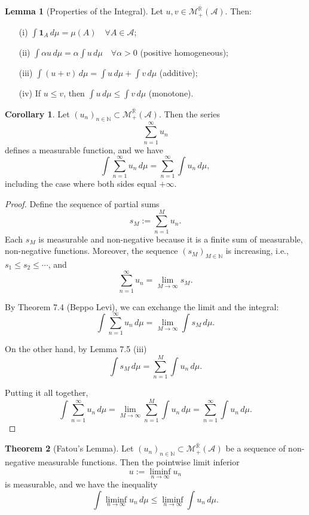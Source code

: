 \documentclass[12pt]{article}
\theoremstyle{definition}
\newtheorem{theorem}{Theorem}[section]
\newtheorem{corollary}{Corollary}[theorem]
\newtheorem{lemma}[theorem]{Lemma}
\begin{document}
\medskip
\begin{lemma}[Properties of the Integral]
Let \( u, v \in \mathcal{M}_+^{\overline{\mathbb{R}}}(\mathcal{A}) \). Then:
\begin{itemize}
    \item[(i)] \( \displaystyle \int \mathbf{1}_A \, d\mu = \mu(A) \quad \forall A \in \mathcal{A} \);
    \item[(ii)] \( \displaystyle \int \alpha u \, d\mu = \alpha \int u \, d\mu \quad \forall \alpha > 0 \) \hfill (positive homogeneous);
    \item[(iii)] \( \displaystyle \int (u + v) \, d\mu = \int u \, d\mu + \int v \, d\mu \) \hfill (additive);
    \item[(iv)] If \( u \leq v \), then \( \displaystyle \int u \, d\mu \leq \int v \, d\mu \) \hfill (monotone).
\end{itemize}
\end{lemma}

\medskip
\begin{corollary}
Let \( (u_n)_{n \in \mathbb{N}} \subset \mathcal{M}_+^{\overline{\mathbb{R}}}(\mathcal{A}) \). Then the series
\[
\sum_{n=1}^{\infty} u_n
\]
defines a measurable function, and we have
\[
\int \sum_{n=1}^{\infty} u_n \, d\mu = \sum_{n=1}^{\infty} \int u_n \, d\mu,
\]
including the case where both sides equal \( +\infty \).
\end{corollary}

\begin{proof}
Define the sequence of partial sums
\[
s_M := \sum_{n=1}^{M} u_n.
\]
Each \( s_M \) is measurable and non-negative because it is a finite sum of measurable, non-negative functions. Moreover, the sequence \( (s_M)_{M \in \mathbb{N}} \) is increasing, i.e., \( s_1 \leq s_2 \leq \cdots \), and
\[
\sum_{n=1}^{\infty} u_n = \lim_{M \to \infty} s_M.
\]

By Theorem 7.4 (Beppo Levi), we can exchange the limit and the integral:
\[
\int \sum_{n=1}^{\infty} u_n \, d\mu = \lim_{M \to \infty} \int s_M \, d\mu.
\]

On the other hand, by Lemma 7.5 (iii)
\[
\int s_M \, d\mu = \sum_{n=1}^{M} \int u_n \, d\mu.
\]

Putting it all together,
\[
\int \sum_{n=1}^{\infty} u_n \, d\mu = \lim_{M \to \infty} \sum_{n=1}^{M} \int u_n \, d\mu = \sum_{n=1}^{\infty} \int u_n \, d\mu.
\]
\end{proof}

\medskip
\begin{theorem}[Fatou's Lemma]
Let \( (u_n)_{n \in \mathbb{N}} \subset \mathcal{M}_+^{\overline{\mathbb{R}}}(\mathcal{A}) \) be a sequence of non-negative measurable functions. Then the pointwise limit inferior
\[
u := \liminf_{n \to \infty} u_n
\]
is measurable, and we have the inequality
\[
\int \liminf_{n \to \infty} u_n \, d\mu \leq \liminf_{n \to \infty} \int u_n \, d\mu.
\]
\end{theorem}
\end{document}
